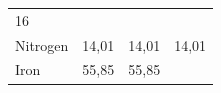 {{\begin{center}
\begin{xtabular}[t]{|l|l|l|l|}
    
        16%
     \tabularnewline{}
    
    
        Nitrogen &
    
    
        14,01 &
    
    
        14,01 &
    
    
        14,01%
     \tabularnewline{}
    
    
        Iron &
    
    
        55,85 &
    
    
        55,85 &
    

\end{xtabular}
\end{center}}}
